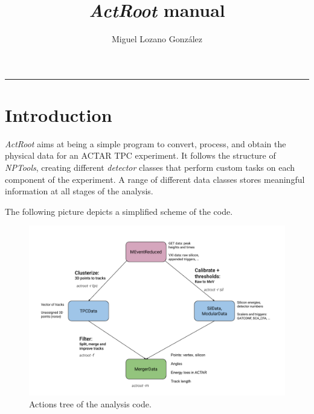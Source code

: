 \documentclass[11pt, a4paper, english]{article}
\title{\textbf{\textit{ActRoot} manual}}
\author{Miguel Lozano González\\
	}
\date{\empty}%
\begin{document}
\begin{minipage}{0.48\linewidth}
	\maketitle
\end{minipage}\hfill
\begin{minipage}{0.48\linewidth}
	\tableofcontents
\end{minipage}

\noindent\rule{\textwidth}{1pt}

\section{Introduction}
\textit{ActRoot} aims at being a simple program to convert, process, and obtain the physical data for an ACTAR TPC experiment. It follows the structure of \textit{NPTools}\cite{nptools}, creating different \textit{detector} classes that perform custom tasks on each component of the experiment. A range of different data classes stores meaningful information at all stages of the analysis.

The following picture depicts a simplified scheme of the code.
\begin{figure}[htbp]
	\centering
	\includegraphics[width=0.9\linewidth]{Figures/ActRoot_schema.pdf}
	\caption{Actions tree of the analysis code.}
	\label{fig:scheme}
\end{figure}
\end{document}
